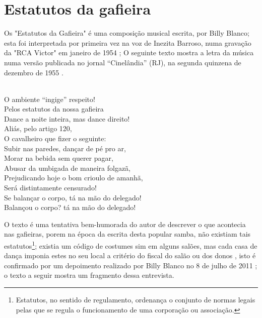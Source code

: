 \section{Estatutos da gafieira}
Os "Estatutos da Gafieira" é uma composição musical escrita, por Billy Blanco;
esta foi interpretada por primeira vez na voz de Inezita Barroso, 
numa gravação da "RCA Victor" em janeiro de 1954 \cite{musicaestatuto};
O seguinte texto mostra a letra da música numa 
versão publicada no jornal ``Cinelândia''  (RJ),
na segunda quinzena de dezembro de 1955 \cite[pp. 95]{musicaestatutojournal1955}.
\begin{citando}%
\\
O ambiente ``ingige'' respeito!\\
Pelos estatutos da nossa gafieira\\
Dance a noite inteira, mas dance direito!\\
Aliás, pelo artigo 120,\\
O cavalheiro que fizer o seguinte:\\
Subir nas paredes, dançar de pé pro ar,\\
Morar na bebida sem querer pagar,\\
Abusar da umbigada de maneira folgazã,\\
Prejudicando hoje o bom crioulo de amanhã,\\
Será distintamente censurado!\\
Se balançar o corpo, tá na mão do delegado!\\
Balançou o corpo? tá na mão do delegado!\\
\end{citando}
O texto é uma tentativa bem-humorada do autor de descrever o que acontecia 
nas gafieiras, porem na época da escrita desta popular samba, não
existiam tais estatutos\footnote{Estatutos, no sentido de regulamento, 
ordenança o conjunto de normas legais pelas que se regula o funcionamento de uma corporação ou associação.};
existia um código de costumes sim \cite[pp. 13]{respeitojournalbrasil1} em alguns salões, 
mas cada casa de dança imponia estes no seu local a critério do fiscal do salão ou dos donos \cite[pp. 10]{simoesjournalbrasil1} \cite[pp. 6 - cad. B]{entrevistajuliojournalbrasil1} \cite[pp. 37]{gafieirajournalmanchete},
isto é confirmado por um depoimento realizado por 
Billy Blanco no 8 de julho de 2011 \cite[pp. 56]{depoimentobilly}; o texto a seguir
mostra um fragmento dessa entrevista.

